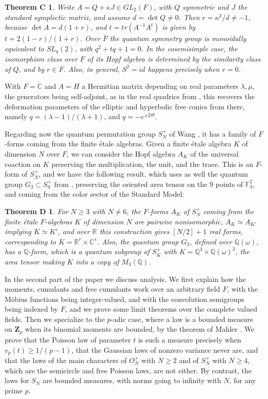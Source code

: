 \documentclass[11pt]{amsart}
\newtheorem*{theoremc}{Theorem C}
\newtheorem*{theoremd}{Theorem D}
\theoremstyle{definition}
\begin{document}
\begin{theoremc}
Write $A=Q+\kappa J\in GL_2(F)$, with $Q$ symmetric and $J$ the standard symplectic matrix, and assume $d=\det Q\neq0$. Then $r=\kappa^2/d\neq-1$, because $\det A=d(1+r)$, and $t=tr(A^{-1}A^t)$ is given by $t=2(1-r)/(1+r)$. Over $\bar F$ the quantum symmetry group is monoidally equivalent to $SL_q(2)$, with $q^2+tq+1=0$. In the cosemisimple case, the isomorphism class over $F$ of its Hopf algebra is determined by the similarity class of $Q$, and by $r\in F$. Also, in general, $S^2=id$ happens precisely when $r=0$.
\end{theoremc}

With $F=\mathbb C$ and $A=H$ a Hermitian matrix depending on real parameters $\lambda,\mu$, the generators being self-adjoint, as in the real quadrics from \cite{fba}, this recovers the deformation parameters of the elliptic and hyperbolic free conics from there, namely $q=(\lambda-1)/(\lambda+1)$, and $q=-e^{\pm2i\theta}$.

Regarding now the quantum permutation group $S_N^+$ of Wang \cite{wan}, it has a family of $F$-forms coming from the finite étale algebras. Given a finite étale algebra $K$ of dimension $N$ over $F$, we can consider the Hopf algebra $A_K$ of the universal coaction on $K$ preserving the multiplication, the unit, and the trace. This is an $F$-form of $S_N^+$, and we have the following result, which uses as well the quantum group $G_3\subset S_9^+$ from \cite{bop}, preserving the oriented area tensor on the 9 points of $\mathbb F_3^2$, and coming from the color sector of the Standard Model:

\begin{theoremd}
For $N\geq3$ with $N\neq6$, the $F$-forms $A_K$ of $S_N^+$ coming from the finite étale $F$-algebras $K$ of dimension $N$ are pairwise nonisomorphic, $A_K\simeq A_{K'}$ implying $K\simeq K'$, and over $\mathbb R$ this construction gives $[N/2]+1$ real forms, corresponding to $K=\mathbb R^r\times\mathbb C^s$. Also, the quantum group $G_3$, defined over $\mathbb Q(\omega)$, has a $\mathbb Q$-form, which is a quantum subgroup of $S_K^+$ with $K=\mathbb Q^3\times\mathbb Q(\omega)^3$, the area tensor making $K$ into a copy of $M_3(\mathbb Q)$.
\end{theoremd}

In the second part of the paper we discuss analysis. We first explain how the moments, cumulants and free cumulants work over an arbitrary field $F$, with the Möbius functions being integer-valued, and with the convolution semigroups being indexed by $F$, and we prove some limit theorems over the complete valued fields. Then we specialize to the $p$-adic case, where a law is a bounded measure on $\mathbf Z_p$ when its binomial moments are bounded, by the theorem of Mahler \cite{mah}. We prove that the Poisson law of parameter $t$ is such a measure precisely when $v_p(t)\geq1/(p-1)$, that the Gaussian laws of nonzero variance never are, and that the laws of the main characters of $O_N^+$ with $N\geq2$ and of $S_N^+$ with $N\geq4$, which are the semicircle and free Poisson laws, are not either. By contrast, the laws for $S_N$ are bounded measures, with norms going to infinity with $N$, for any prime $p$.
\end{document}
